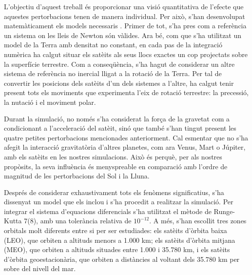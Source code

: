 \documentclass{article}
\begin{document}
L'objectiu d'aquest treball és proporcionar una visió quantitativa de l'efecte que aquestes pertorbacions tenen de manera individual. Per això, s'han desenvolupat matemàticament els models necessaris \cite{montenbruck,vallado}. Primer de tot, s'ha pres com a referència un sistema on les lleis de Newton són vàlides. Ara bé, com que s'ha utilitzat un model de la Terra amb densitat no constant, en cada pas de la integració numèrica ha calgut situar els satè\lgem its als seus llocs exactes un cop projectats sobre la superfície terrestre. Com a conseqüència, s'ha hagut de considerar un altre sistema de referència no inercial lligat a la rotació de la Terra. Per tal de convertir les posicions dels satè\lgem its d'un dels sistemes a l'altre, ha calgut tenir present tots els moviments que experimenta l'eix de rotació terrestre: la precessió, la nutació i el moviment polar.

Durant la simulació, no només s'ha considerat la força de la gravetat com a condicionant a l'acceleració del satè\lgem it, sinó que també s'han tingut present les quatre petites pertorbacions mencionades anteriorment. Cal esmentar que no s'ha afegit la interacció gravitatòria d'altres planetes, com ara Venus, Mart o Júpiter, amb els satè\lgem its en les nostres simulacions. Això és perquè, per als nostres propòsits, la seva influència és menyspreable en comparació amb l'ordre de magnitud de les pertorbacions del Sol i la Lluna.

Després de considerar exhaustivament tots els fenòmens significatius, s'ha dissenyat un model que els inclou i s'ha procedit a realitzar la simulació. Per integrar el sistema d'equacions diferencials s'ha utilitzat el mètode de Runge-Kutta 7(8), amb una tolerància relativa de $10^{-12}$. A més, s'han escollit tres zones orbitals molt diferents entre si per ser estudiades: els satè\lgem its d'òrbita baixa (LEO), que orbiten a altituds menors a 1.000 km; els satè\lgem its d'òrbita mitjana (MEO), que orbiten a altituds situades entre 1.000 i 35.780 km, i els satè\lgem its d'òrbita geoestacionària, que orbiten a distàncies al voltant dels 35.780 km per sobre del nivell del mar.

\printbibliography[title={Referències}]
\end{document}
